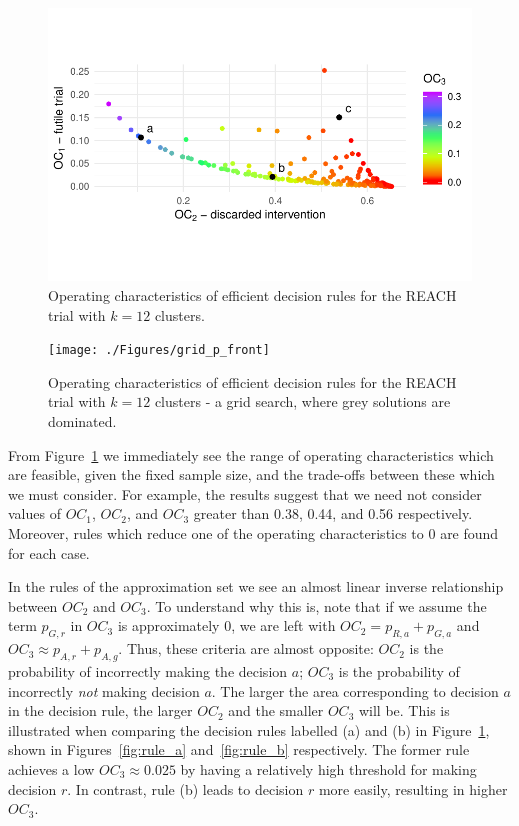 \documentclass{article} %
\begin{document}
\begin{figure}
\centering
\includegraphics[scale=0.7]{./Figures/p_front}
\caption{Operating characteristics of efficient decision rules for the REACH trial with $k=12$ clusters.}
\label{fig:p_front}
\end{figure}

\begin{figure}
\centering
\texttt{[image: ./Figures/grid\_p\_front]}
\caption{Operating characteristics of efficient decision rules for the REACH trial with $k=12$ clusters - a grid search, where grey solutions are dominated.}
\label{fig:grid_p_front}
\end{figure}

From Figure~\ref{fig:p_front} we immediately see the range of operating characteristics which are feasible, given the fixed sample size, and the trade-offs between these which we must consider. For example, the results suggest that we need not consider values of $OC_{1}$, $OC_{2}$, and $OC_{3}$ greater than 0.38, 0.44, and 0.56 respectively. Moreover, rules which reduce one of the operating characteristics to 0 are found for each case.

In the rules of the approximation set we see an almost linear inverse relationship between $OC_{2}$ and $OC_{3}$. To understand why this is, note that if we assume the term $p_{G,r}$ in $OC_{3}$ is approximately 0, we are left with $OC_{2} = p_{R,a} + p_{G,a}$ and $OC_{3} \approx p_{A,r} + p_{A,g}$. Thus, these criteria are almost opposite: $OC_{2}$ is the probability of incorrectly making the decision $a$; $OC_{3}$ is the probability of incorrectly \emph{not} making decision $a$. The larger the area corresponding to decision $a$ in the decision rule, the larger $OC_{2}$ and the smaller $OC_{3}$ will be. This is illustrated when comparing the decision rules labelled (a) and (b) in Figure~\ref{fig:p_front}, shown in Figures~\ref{fig:rule_a} and~\ref{fig:rule_b} respectively. The former rule achieves a low $OC_{3} \approx 0.025$ by having a relatively high threshold for making decision $r$. In contrast, rule (b) leads to decision $r$ more easily, resulting in higher $OC_{3}$.
\end{document}
